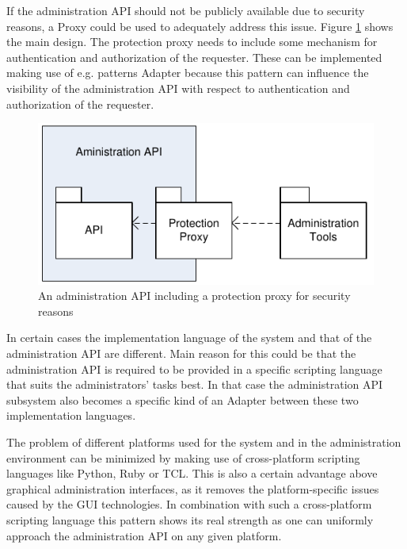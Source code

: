 If the administration API should not be publicly available due to security reasons, a {\sc Proxy} \cite{Buschmann1996} could be used to adequately address this issue. Figure \ref{fig:provideAPIDiagram-02} shows the main design. The protection proxy needs to include some mechanism for authentication and authorization of the requester. These can be implemented making use of e.g. patterns {\sc Adapter} \cite{Gamma95} because this pattern can influence the visibility of the administration API with respect to authentication and authorization of the requester.

\begin{figure}[h]
\centering
\includegraphics{patterns/provideAPIDiagram-02.pdf}
\caption{An administration API including a protection proxy for security reasons}
\label{fig:provideAPIDiagram-02}
\end{figure}

In certain cases the implementation language of the system and that of the administration API are different. Main reason for this could be that the administration API is required to be provided in a specific scripting language that suits the administrators' tasks best. In that case the administration API subsystem also becomes a specific kind of an {\sc Adapter} \cite{Gamma95} between these two implementation languages.

The problem of different platforms used for the system and in the administration environment can be minimized by making use of cross-platform scripting languages like Python, Ruby or TCL. This is also a certain advantage above graphical administration interfaces, as it removes the platform-specific issues caused by the GUI technologies. In combination with such a cross-platform scripting language this pattern shows its real strength as one can uniformly approach the administration API on any given platform.

